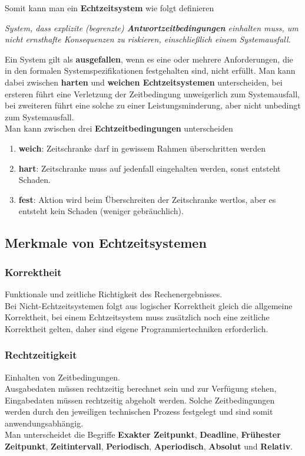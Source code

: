 \documentclass[a4paper, 10 pt, conference]{ieeeconf}
\begin{document}
Somit kann man ein \textbf{Echtzeitsystem} wie folgt definieren

\begin{center}
\textit{System, dass explizite (begrenzte) \textbf{Antwortzeitbedingungen} einhalten muss, um nicht ernsthafte Konsequenzen zu riskieren, einschließlich einem Systemausfall.} 
\end{center}

Ein System gilt als \textbf{ausgefallen}, wenn es eine oder mehrere Anforderungen, die in den formalen Systemspezifikationen festgehalten sind, nicht erfüllt. Man kann dabei zwischen \textbf{harten} und \textbf{weichen Echtzeitsystemen} unterscheiden, bei ersteren führt 	eine Verletzung der Zeitbedingung unweigerlich zum Systemausfall, bei zweiteren führt eine solche zu einer Leistungsminderung, aber nicht unbedingt zum Systemausfall. 
\\
Man kann zwischen drei \textbf{Echtzeitbedingungen} unterscheiden
\begin{enumerate}
\item \textbf{weich}: Zeitschranke darf in gewissem Rahmen überschritten werden
\item \textbf{hart}: Zeitschranke muss auf jedenfall eingehalten werden, sonst entsteht Schaden. 
\item \textbf{fest}: Aktion wird beim Überschreiten der Zeitschranke wertlos, aber es entsteht kein Schaden (weniger gebräuchlich).
\end{enumerate}

\subsection*{Merkmale von Echtzeitsystemen}
\subsubsection*{Korrektheit}
Funktionale und zeitliche Richtigkeit des Rechenergebnisses. \\
Bei Nicht-Echtzeitsystemen folgt aus logischer Korrektheit gleich die allgemeine Korrektheit, bei einem Echtzeitsystem muss zusätzlich noch eine zeitliche Korrektheit gelten, daher sind eigene Programmiertechniken erforderlich.
\subsubsection*{Rechtzeitigkeit}
Einhalten von Zeitbedingungen. \\
Ausgabedaten müssen rechtzeitig berechnet sein und zur Verfügung stehen, Eingabedaten müssen rechtzeitig abgeholt werden. Solche Zeitbedingungen werden durch den jeweiligen technischen Prozess festgelegt und sind somit anwendungsabhängig. \\
Man unterscheidet die Begriffe \textbf{Exakter Zeitpunkt}, \textbf{Deadline}, \textbf{Frühester Zeitpunkt}, \textbf{Zeitintervall}, \textbf{Periodisch}, \textbf{Aperiodisch}, \textbf{Absolut} und \textbf{Relativ}. 
\end{document}
